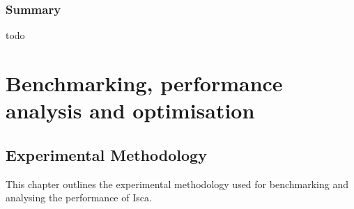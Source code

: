 \documentclass[a4paper,11pt]{report}
\begin{document}
\section{Summary}
todo




\part{Benchmarking, performance analysis and optimisation}
\chapter{Experimental Methodology}
This chapter outlines the experimental methodology used for benchmarking and analysing the performance of Isca. 
%
%	
%	
%	
%	
%	
%	
\end{document}
